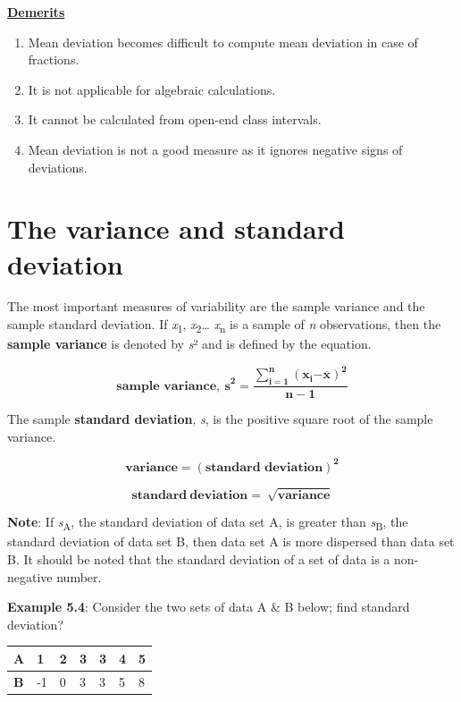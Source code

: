 \documentclass[
]{book}
\begin{document}
\ul{\textbf{Demerits}}

\begin{enumerate}
\def\labelenumi{\arabic{enumi}.}
\item
  Mean deviation becomes difficult to compute mean deviation in case
  of fractions.
\item
  It is not applicable for algebraic calculations.
\item
  It cannot be calculated from open-end class intervals.
\item
  Mean deviation is not a good measure as it ignores negative signs of
  deviations.
\end{enumerate}

\hypertarget{the-variance-and-standard-deviation}{%
\section{The variance and standard deviation}\label{the-variance-and-standard-deviation}}

The most important measures of variability are the sample variance and
the sample standard deviation. If \emph{x}\textsubscript{1}, \emph{x}\textsubscript{2}\ldots{} \emph{x}\textsubscript{n} is a sample
of \emph{n} observations, then the \textbf{sample variance} is denoted by \emph{s}² and
is defined by the equation.

\[{\mathbf{\text{sample variance}},\ \mathbf{s}}^{\mathbf{2}}\mathbf{=}\frac{\sum_{\mathbf{i = 1}}^{\mathbf{n}}\left( \mathbf{x}_{\mathbf{i}}\mathbf{-}\overline{\mathbf{x}} \right)^{\mathbf{2}}}{\mathbf{n - 1}}\]

The sample \textbf{standard deviation}, \emph{s}, is the positive square root of
the sample variance.

\[\mathbf{variance =}\left( \mathbf{\text{standard deviation}} \right)^{\mathbf{2}}\]

\[\mathbf{standard\ deviation = \ }\sqrt{\mathbf{\text{variance}}}\]

\textbf{Note}: If \emph{s}\textsubscript{A}, the standard deviation of data set A, is greater
than \emph{s}\textsubscript{B}, the standard deviation of data set B, then data set A is
more dispersed than data set B. It should be noted that the standard
deviation of a set of data is a non-negative number.

\textbf{Example 5.4}: Consider the two sets of data A \& B below; find
standard deviation?

\begin{longtable}[]{@{}lllllll@{}}
\toprule\noalign{}
\textbf{A} & 1 & 2 & 3 & 3 & 4 & 5 \\
\midrule\noalign{}
\endhead
\bottomrule\noalign{}
\endlastfoot
\textbf{B} & -1 & 0 & 3 & 3 & 5 & 8 \\
\end{longtable}
\end{document}
